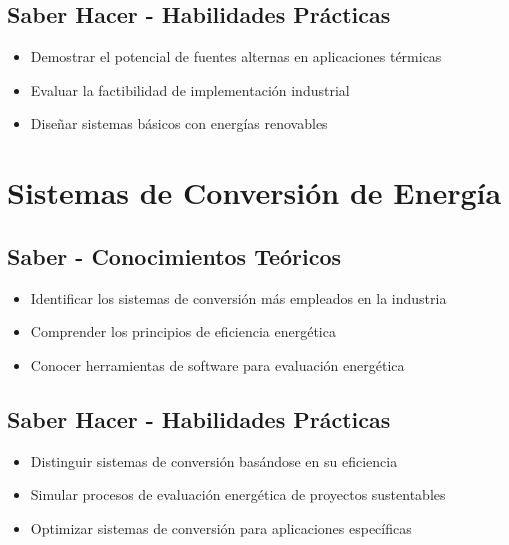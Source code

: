 \documentclass[12pt,a4paper,twoside]{book}
\begin{document}
	\subsection{Saber Hacer - Habilidades Prácticas}
	\begin{hacerbox}
		\begin{itemize}
			\item Demostrar el potencial de fuentes alternas en aplicaciones térmicas
			\item Evaluar la factibilidad de implementación industrial
			\item Diseñar sistemas básicos con energías renovables
		\end{itemize}
	\end{hacerbox}
	
	\section{Sistemas de Conversión de Energía}
	\label{sec:conversion_energia}
	
	\subsection{Saber - Conocimientos Teóricos}
	\begin{saberbox}
		\begin{itemize}
			\item Identificar los sistemas de conversión más empleados en la industria
			\item Comprender los principios de eficiencia energética
			\item Conocer herramientas de software para evaluación energética
		\end{itemize}
	\end{saberbox}
	
	\subsection{Saber Hacer - Habilidades Prácticas}
	\begin{hacerbox}
		\begin{itemize}
			\item Distinguir sistemas de conversión basándose en su eficiencia
			\item Simular procesos de evaluación energética de proyectos sustentables
			\item Optimizar sistemas de conversión para aplicaciones específicas
		\end{itemize}
	\end{hacerbox}
	
\end{document}
